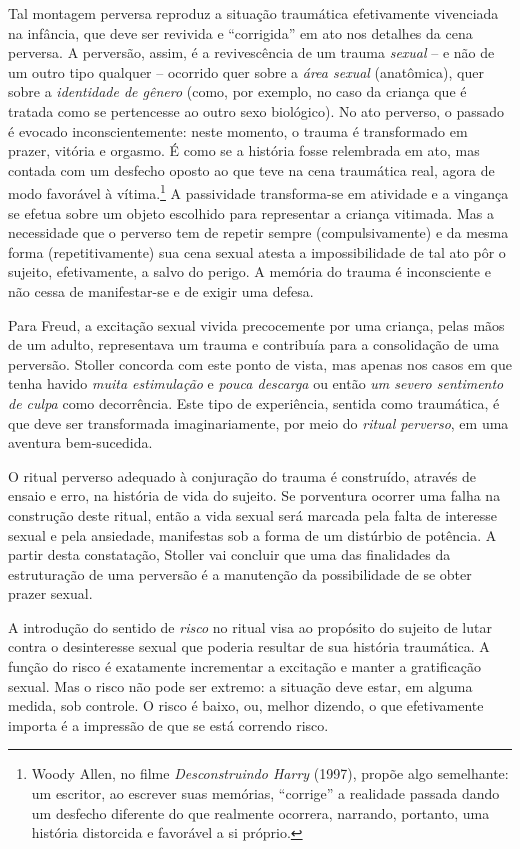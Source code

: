 Tal montagem perversa reproduz a situação traumática efetivamente
vivenciada na infância, que deve ser revivida e ``corrigida'' em ato nos
detalhes da cena perversa. A perversão, assim, é a revivescência de um
trauma \emph{sexual} -- e não de um outro tipo qualquer -- ocorrido quer
sobre a \emph{área sexual} (anatômica), quer sobre a \emph{identidade de
gênero} (como, por exemplo, no caso da criança que é tratada como se
pertencesse ao outro sexo biológico). No ato perverso, o passado é
evocado inconscientemente: neste momento, o trauma é transformado em
prazer, vitória e orgasmo. É como se a história fosse relembrada em ato,
mas contada com um desfecho oposto ao que teve na cena traumática real,
agora de modo favorável à vítima.\footnote{Woody Allen, no filme
  \emph{Desconstruindo Harry} (1997), propõe algo semelhante: um
  escritor, ao escrever suas memórias, ``corrige'' a realidade passada
  dando um desfecho diferente do que realmente ocorrera, narrando,
  portanto, uma história distorcida e favorável a si próprio.} A
passividade transforma-se em atividade e a vingança se efetua sobre um
objeto escolhido para representar a criança vitimada. Mas a necessidade
que o perverso tem de repetir sempre (compulsivamente) e da mesma forma
(repetitivamente) sua cena sexual atesta a impossibilidade de tal ato
pôr o sujeito, efetivamente, a salvo do perigo. A memória do trauma é
inconsciente e não cessa de manifestar-se e de exigir uma defesa.

Para Freud, a excitação sexual vivida precocemente por uma criança,
pelas mãos de um adulto, representava um trauma e contribuía para a
consolidação de uma perversão. Stoller concorda com este ponto de vista,
mas apenas nos casos em que tenha havido \emph{muita estimulação} e
\emph{pouca descarga} ou então \emph{um severo sentimento de culpa} como
decorrência. Este tipo de experiência, sentida como traumática, é que
deve ser transformada imaginariamente, por meio do \emph{ritual
perverso}, em uma aventura bem-sucedida.

O ritual perverso adequado à conjuração do trauma é construído, através
de ensaio e erro, na história de vida do sujeito. Se porventura ocorrer
uma falha na construção deste ritual, então a vida sexual será marcada
pela falta de interesse sexual e pela ansiedade, manifestas sob a forma
de um distúrbio de potência. A partir desta constatação, Stoller vai
concluir que uma das finalidades da estruturação de uma perversão é a
manutenção da possibilidade de se obter prazer sexual.

A introdução do sentido de \emph{risco} no ritual visa ao propósito do
sujeito de lutar contra o desinteresse sexual que poderia resultar de
sua história traumática. A função do risco é exatamente incrementar a
excitação e manter a gratificação sexual. Mas o risco não pode ser
extremo: a situação deve estar, em alguma medida, sob controle. O risco
é baixo, ou, melhor dizendo, o que efetivamente importa é a impressão de
que se está correndo risco.

